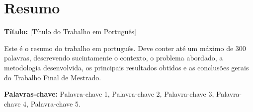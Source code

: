 \chapter*{Resumo}

{\bfseries Título:} [Título do Trabalho em Português]

\vspace{0.5cm}

Este é o resumo do trabalho em português. Deve conter até um máximo de 300 palavras, descrevendo sucintamente o contexto, o problema abordado, a metodologia desenvolvida, os principais resultados obtidos e as conclusões gerais do Trabalho Final de Mestrado.

\vspace{1cm}

\noindent\textbf{Palavras-chave:} Palavra-chave 1, Palavra-chave 2, Palavra-chave 3, Palavra-chave 4, Palavra-chave 5.
\newpage
